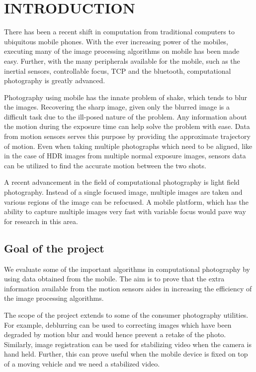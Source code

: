 \documentclass[BTech]{iitmdiss}
\begin{document}
\chapter{INTRODUCTION}
\label{chap:intro}
There has been a recent shift in computation from traditional computers
to ubiquitous mobile phones. With the ever increasing power of the mobiles, 
executing many of the image processing algorithms on mobile has been 
made easy. Further, with the many peripherals available for the mobile, such as
the inertial sensors, controllable focus, TCP and the bluetooth, 
computational photography is greatly advanced. 

Photography using mobile has the innate problem of shake, which tends to
blur the images. Recovering the sharp image, given only the blurred image
is a difficult task due to the ill-posed nature of the problem. Any
information about the motion during the exposure time can help solve
the problem with ease. Data from motion sensors serves this purpose by
providing the approximate trajectory of motion. Even when taking multiple
photographs which need to be aligned, like in the case of HDR images from
multiple normal exposure images, sensors data can be utilized to find
the accurate motion between the two shots. 

A recent advancement in the field of computational photography is light
field photography. Instead of a single focused image, multiple images
are taken and various regions of the image can be refocused. A mobile
platform, which has the ability to capture multiple images very fast
with variable focus would pave way for research in this area. 

\section{Goal of the project}
\label{intro:goal}
We evaluate some of the important algorithms in computational
photography by using data obtained from the mobile. The aim is to prove
that the extra information available from the motion sensors aides in
increasing the efficiency of the image processing algorithms. 

The scope of the project extends to some of the consumer photography utilities. For example, deblurring can be used to correcting images which have been
degraded by motion blur and would hence prevent a retake of the photo. Similarly, image registration can be used for stabilizing video when the
camera is hand held. Further, this can prove useful when the mobile
device is fixed on top of a moving vehicle and we need a stabilized video.
\end{document}
